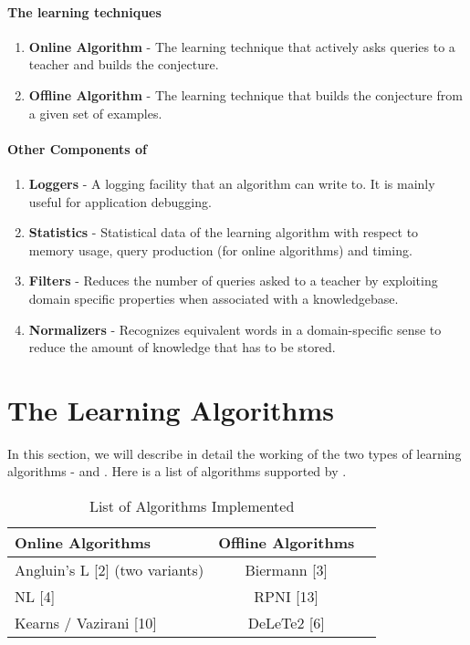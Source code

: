\paragraph{The learning techniques}
\begin{enumerate}
 \item \textbf{Online Algorithm} - The learning technique that actively asks queries to a teacher and builds the conjecture.
 \item \textbf{Offline Algorithm} - The learning technique that builds the conjecture from a given set of examples.
\end{enumerate}

\paragraph{Other Components of \libalf}
\begin{enumerate}
 \item \textbf{Loggers} - A logging facility that an algorithm can write to. It is mainly useful for application debugging.
 \item \textbf{Statistics} - Statistical data of the learning algorithm with respect to memory usage, query production (for online algorithms) and timing.
 \item \textbf{Filters} - Reduces the number of queries asked to a teacher by exploiting domain specific properties when associated with a knowledgebase.
 \item \textbf{Normalizers} - Recognizes equivalent words in a domain-specific sense to reduce the amount of knowledge that has to be stored.
\end{enumerate}


\section{The Learning Algorithms}
In this section, we will describe in detail the working of the two types of learning algorithms - \online and \offline. Here is a list of algorithms supported by \libalf.

\begin{table} [h]
\centering
\begin{tabular}[c]{lcr}
\toprule[1pt]
Online Algorithms & Offline Algorithms \\	
\midrule
Angluin's L [2] (two variants) & Biermann [3] \\
NL [4] & RPNI [13] \\
Kearns / Vazirani [10] & DeLeTe2 [6]\\
\bottomrule[1pt]
\end{tabular}
\caption{List of Algorithms Implemented}
\label{algtables1}
\end{table}

